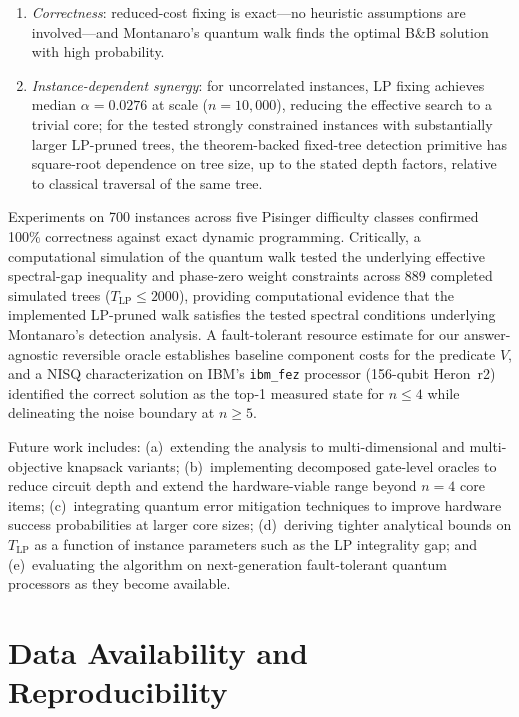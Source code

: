 \documentclass[conference]{IEEEtran} \IEEEoverridecommandlockouts
\begin{document}
\begin{enumerate}     \item \textit{Correctness}: reduced-cost fixing is exact---no heuristic assumptions are involved---and Montanaro's quantum walk finds the optimal B\&B solution with high probability.     \item \textit{Instance-dependent synergy}: for uncorrelated instances, LP fixing achieves median $\alpha = 0.0276$ at scale ($n = 10{,}000$), reducing the effective search to a trivial core; for the tested strongly constrained instances with substantially larger LP-pruned trees, the theorem-backed fixed-tree detection primitive has square-root dependence on tree size, up to the stated depth factors, relative to classical traversal of the same tree.     \end{enumerate}

Experiments on 700 instances across five Pisinger difficulty classes confirmed 100\% correctness against exact dynamic programming. Critically, a computational simulation of the quantum walk tested the underlying effective spectral-gap inequality and phase-zero weight constraints across 889 completed simulated trees ($T_{\text{LP}} \le 2000$), providing computational evidence that the implemented LP-pruned walk satisfies the tested spectral conditions underlying Montanaro's detection analysis. A fault-tolerant resource estimate for our answer-agnostic reversible oracle establishes baseline component costs for the predicate $V$, and a NISQ characterization on IBM's \texttt{ibm\_fez} processor (156-qubit Heron~r2) identified the correct solution as the top-1 measured state for $n \leq 4$ while delineating the noise boundary at $n \geq 5$.

Future work includes: (a)~extending the analysis to multi-dimensional and multi-objective knapsack variants; (b)~implementing decomposed gate-level oracles to reduce circuit depth and extend the hardware-viable range beyond $n = 4$ core items; (c)~integrating quantum error mitigation techniques to improve hardware success probabilities at larger core sizes; (d)~deriving tighter analytical bounds on $T_{\text{LP}}$ as a function of instance parameters such as the LP integrality gap; and (e)~evaluating the algorithm on next-generation fault-tolerant quantum processors as they become available.




\section{Data Availability and Reproducibility}
\end{document}
